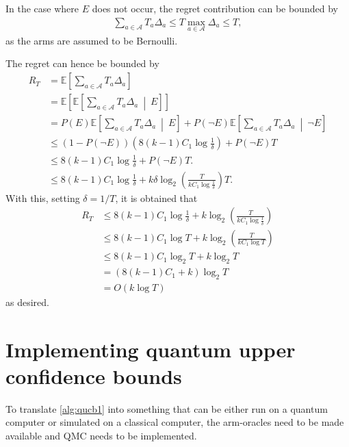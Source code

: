 In the case where $E$ does not occur, the regret contribution can be bounded by
\begin{equation}
    \begin{aligned}
        \sum_{a \in \mathcal{A}} T_a \Delta_a \leq T \max_{a\in \mathcal{A}} \Delta_a \leq T,
    \end{aligned}
\end{equation}
as the arms are assumed to be Bernoulli.

The regret can hence be bounded by
\begin{equation}
    \begin{aligned}
        R_T
         & =
        \mathbb{E}\left[ \sum_{a \in \mathcal{A}} T_a \Delta_a \right]
        \\
         & =
        \mathbb{E}\left[ \mathbb{E}\left[ \sum_{a \in \mathcal{A}} T_a \Delta_a \ \middle| \ E \right] \right]
        \\
         & = P(E) \mathbb{E}\left[ \sum_{a \in \mathcal{A}} T_a \Delta_a \ \middle| \ E \right] + P(\neg E) \mathbb{E}\left[ \sum_{a \in \mathcal{A}} T_a \Delta_a \ \middle| \ \neg E \right]
        \\
         & \leq
        (1 - P(\neg E)) \left( 8(k-1)C_1 \log \frac1\delta \right)
        + P(\neg E) T
        \\
         & \leq
        8(k-1)C_1 \log \frac1\delta + P(\neg E) T.
        \\
         & \leq
        8(k-1)C_1 \log \frac1\delta + k\delta \log_2 \left(\frac{T}{kC_1 \log \frac1\delta}\right) T.
    \end{aligned}
\end{equation}
With this, setting $\delta = 1/T$, it is obtained that
\begin{equation}
    \begin{aligned}
        R_T
         & \leq
        8(k-1)C_1 \log \frac1\delta + k \log_2 \left(\frac{T}{kC_1 \log \frac1\delta}\right)
        \\
         & \leq
        8(k-1)C_1 \log T + k \log_2 \left(\frac{T}{kC_1 \log T}\right)
        \\
         & \leq
        8(k-1)C_1 \log_2 T + k \log_2 T
        \\
         & =
        (8(k-1)C_1 + k) \log_2 T
        \\
         & =
        O(k \log T)
    \end{aligned}
\end{equation}
as desired.

\section{Implementing quantum upper confidence bounds}
To translate \cref{alg:qucb1} into something that can be either run on a quantum computer or simulated on a classical computer, the arm-oracles need to be made available and QMC needs to be implemented.

